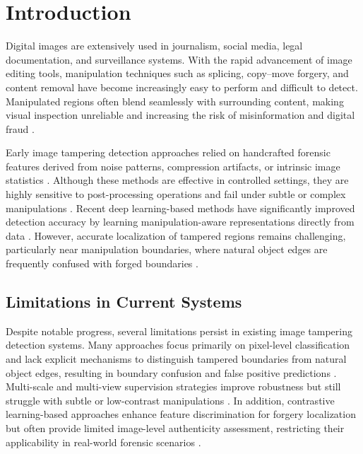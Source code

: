 \documentclass[runningheads]{llncs}
\begin{document}

\section{Introduction}

Digital images are extensively used in journalism, social media, legal documentation, and surveillance systems. With the rapid advancement of image editing tools, manipulation techniques such as splicing, copy--move forgery, and content removal have become increasingly easy to perform and difficult to detect. Manipulated regions often blend seamlessly with surrounding content, making visual inspection unreliable and increasing the risk of misinformation and digital fraud \cite{wu2019mantra,chen2021multi,hsu2006columbia,dong2013casia}.

Early image tampering detection approaches relied on handcrafted forensic features derived from noise patterns, compression artifacts, or intrinsic image statistics \cite{hsu2006columbia}. Although these methods are effective in controlled settings, they are highly sensitive to post-processing operations and fail under subtle or complex manipulations \cite{dong2013casia,wen2016coverage}. Recent deep learning-based methods have significantly improved detection accuracy by learning manipulation-aware representations directly from data \cite{wu2019mantra,chen2021multi}. However, accurate localization of tampered regions remains challenging, particularly near manipulation boundaries, where natural object edges are frequently confused with forged boundaries \cite{chen2021multi,hao2024ecnet}.

\subsection{Limitations in Current Systems}

Despite notable progress, several limitations persist in existing image tampering detection systems. Many approaches focus primarily on pixel-level classification and lack explicit mechanisms to distinguish tampered boundaries from natural object edges, resulting in boundary confusion and false positive predictions \cite{wu2019mantra,hao2024ecnet}. Multi-scale and multi-view supervision strategies improve robustness but still struggle with subtle or low-contrast manipulations \cite{chen2021multi}. In addition, contrastive learning-based approaches enhance feature discrimination for forgery localization but often provide limited image-level authenticity assessment, restricting their applicability in real-world forensic scenarios \cite{niloy2023cfl,chen2020simclr}.
\end{document}
